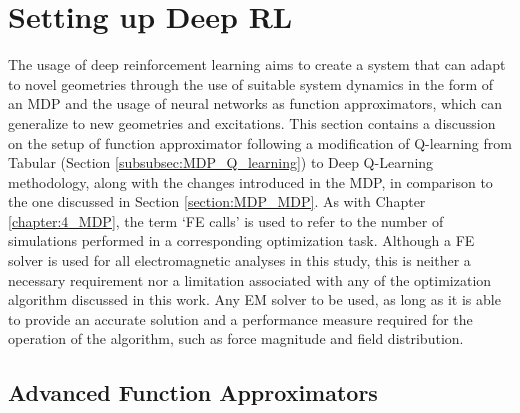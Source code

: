 \section{Setting up Deep RL}

The usage of deep reinforcement learning aims to create a system that can adapt to novel geometries through the use of suitable system dynamics in the form of an MDP and the usage of neural networks as function approximators, which can generalize to new geometries and excitations. This section contains a discussion on the setup of function approximator following a modification of Q-learning from Tabular (Section \ref{subsubsec:MDP_Q_learning}) to Deep Q-Learning methodology, along with the changes introduced in the MDP, in comparison to the one discussed in Section \ref{section:MDP_MDP}. As with Chapter \ref{chapter:4_MDP}, the term `FE calls' is used to refer to the number of simulations performed in a corresponding optimization task. Although a FE solver is used for all electromagnetic analyses in this study, this is 
neither a necessary requirement nor a limitation associated with any of the optimization algorithm discussed in this work. Any EM solver to be used, as long as it is able to provide an accurate solution and a performance measure required for the operation of the algorithm, such as force magnitude and field distribution.

\subsection{Advanced Function Approximators}

